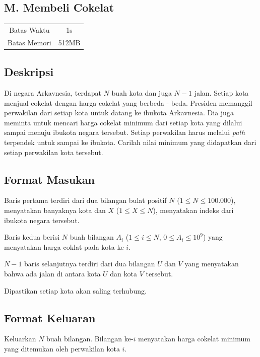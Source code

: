 \documentclass{article}
\begin{document}
\begin{center}
    \section*{M. Membeli Cokelat} %

    \begin{tabular}{ | c c | }
        \hline
        Batas Waktu  & 1s \\    %
        Batas Memori & 512MB \\  %
        \hline
    \end{tabular}
\end{center}

\subsection*{Deskripsi}
Di negara Arkavnesia, terdapat $N$ buah kota dan juga $N-1$ jalan. Setiap kota menjual cokelat dengan harga cokelat yang berbeda - beda. Presiden memanggil perwakilan dari setiap kota untuk datang ke ibukota Arkavnesia. Dia juga meminta untuk mencari harga cokelat minimum dari setiap kota yang dilalui sampai menuju ibukota negara tersebut. Setiap perwakilan harus melalui \textit{path} terpendek untuk sampai ke ibukota. Carilah nilai minimum yang didapatkan dari setiap perwakilan kota tersebut.

\subsection*{Format Masukan}
Baris pertama terdiri dari dua bilangan bulat positif $N$ ($1 \leq N \leq 100.000$), menyatakan banyaknya kota dan $X$ ($1 \leq X \leq N$), menyatakan indeks dari ibukota negara tersebut.

Baris kedua berisi $N$ buah bilangan $A_i$ ($1 \leq i \leq N$, $0 \leq A_i \leq 10^9$) yang menyatakan harga coklat pada kota ke $i$.

$N-1$ baris selanjutnya terdiri dari dua bilangan $U$ dan $V$ yang menyatakan bahwa ada jalan di antara kota $U$ dan kota $V$ tersebut.

Dipastikan setiap kota akan saling terhubung.

\subsection*{Format Keluaran}
Keluarkan $N$ buah bilangan. Bilangan ke-$i$ menyatakan harga cokelat minimum yang ditemukan oleh perwakilan kota $i$.
\end{document}
